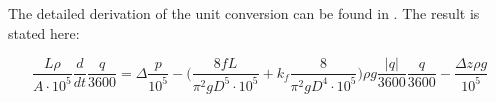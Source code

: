 
The detailed derivation of the unit conversion can be found in . The result is stated here: 

\begin{equation}
   \frac{L \rho}{A\cdot10^5} \frac{d}{dt}\frac{q}{3600} = \Delta \frac{p}{10^5} - \Big(\frac{8fL}{\pi^{2}gD^5\cdot10^5} + k_f \frac{8}{\pi^2gD^4\cdot10^5}\Big) \rho g \frac{|q|}{3600} \frac{q}{3600} - \frac{\Delta z \rho g}{10^5}
\end{equation}
